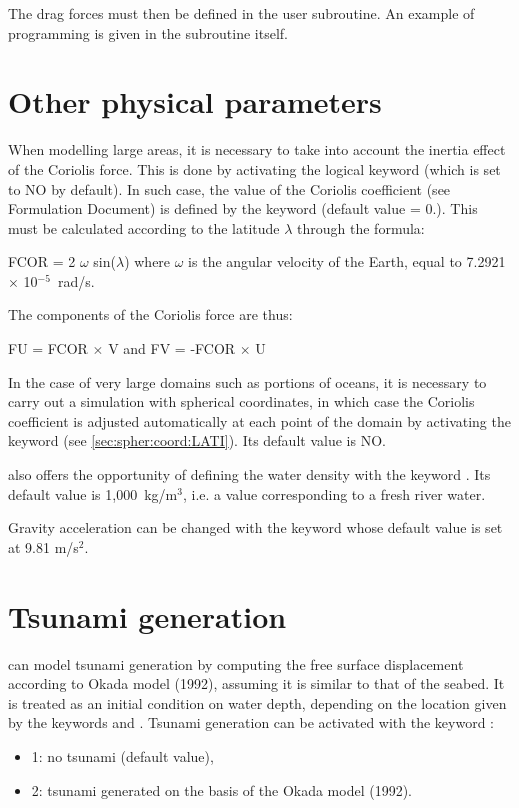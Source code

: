 The drag forces must then be defined in the  user subroutine.
An example of programming is given in the subroutine itself.


\section{Other physical parameters}

When modelling large areas, it is necessary to take into account the inertia
effect of the Coriolis force.
This is done by activating the logical keyword  (which is set
to NO by default).
In such case, the value of the Coriolis coefficient (see Formulation Document)
is defined by the keyword  (default value = 0.).
This must be calculated according to the latitude $\lambda$ through the formula:

 FCOR = 2 $\omega$ sin($\lambda$) where $\omega$ is the angular velocity of the
Earth, equal to 7.2921 $\times$ 10$^{-5}$~rad/s.

The components of the Coriolis force are thus:

FU = FCOR $\times$ V         and         FV = -FCOR $\times$ U

In the case of very large domains such as portions of oceans,
it is necessary to carry out a simulation with spherical coordinates,
in which case the Coriolis coefficient is adjusted automatically at each point
of the domain by activating the keyword 
(see \ref{sec:spher:coord:LATI}).
Its default value is NO.

 also offers the opportunity of defining the water density
with the keyword .
Its default value is 1,000~kg/m$^3$, i.e. a value corresponding to a fresh river
water.

Gravity acceleration can be changed with the keyword 
whose default value is set at 9.81 m/s$^2$.


\section{Tsunami generation}

 can model tsunami generation by computing the free surface
displacement according to Okada model (1992), assuming it is similar to that
of the seabed.
It is treated as an initial condition on water depth, depending on the
location given by the keywords
 and .
Tsunami generation can be activated with the keyword
:
\begin{itemize}
\item 1: no tsunami (default value),
\item 2: tsunami generated on the basis of the Okada model (1992).
\end{itemize}

